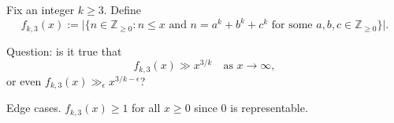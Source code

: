 Fix an integer $k\ge 3$.
Define
\[
f_{k,3}(x):=\bigl|\{n\in\mathbb Z_{\ge 0}: n\le x\text{ and }n=a^k+b^k+c^k\text{ for some }a,b,c\in\mathbb Z_{\ge 0}\}\bigr|.
\]

Question: is it true that
\[
f_{k,3}(x)\gg x^{3/k}\quad\text{as }x\to\infty,
\]
or even $f_{k,3}(x)\gg_\epsilon x^{3/k-\epsilon}$?

Edge cases.
$f_{k,3}(x)\ge 1$ for all $x\ge 0$ since $0$ is representable.
